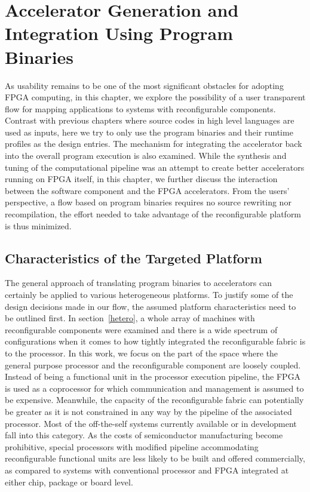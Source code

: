 \chapter{Accelerator Generation and Integration Using Program Binaries}
\label{instrumentChap}
As usability remains to be one of the most significant obstacles for adopting FPGA computing, in this chapter, we explore the possibility of a user
transparent flow for mapping applications to systems with reconfigurable components.
Contrast with previous chapters where source codes in high level
languages are used as inputs, here we try to only use the program binaries and their runtime profiles as the design entries. 
The mechanism for integrating the accelerator back into the overall program execution is also examined. While the synthesis and tuning of the computational pipeline was an attempt to create better accelerators running on FPGA itself, in this chapter, we
further discuss the interaction between the software component and the FPGA accelerators. From the users' perspective, a flow based on
program binaries requires no source rewriting
nor recompilation, the effort needed to take advantage
of the reconfigurable platform is thus minimized. 

\section{Characteristics of the Targeted Platform}
\label{chartarg}
The general approach of translating program binaries to accelerators can certainly be applied to various heterogeneous platforms. To justify some of the design decisions made in our flow, the assumed platform 
characteristics need to be outlined first. 
In section~\ref{hetero}, a whole array of machines with reconfigurable
components were examined and there is a wide spectrum of configurations
when it comes to how tightly integrated the reconfigurable fabric is to
the processor. 
In this work, we focus on the part of the space where the general purpose processor and the reconfigurable component are loosely coupled.
Instead of being a functional unit in the processor
execution pipeline, the FPGA is used as a coprocessor for which
communication and management is assumed to be expensive.
Meanwhile, the capacity of the reconfigurable fabric can potentially be greater as it is not constrained in any way by the pipeline of the associated processor. 
Most of the off-the-self systems currently available or in development~\cite{xeonwithfpga} fall into this category. As the
costs of semiconductor manufacturing become prohibitive, 
special processors with modified pipeline accommodating
reconfigurable functional units are less likely to be built
and offered commercially, as compared to systems with conventional
processor and FPGA integrated at either chip, package or board level.

